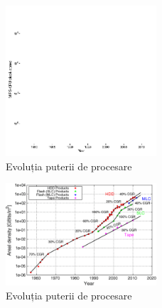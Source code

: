 \begin{figure}
	\centering
	\includegraphics[width=0.5\textwidth]{cpu_and_gpu_trends}
	\caption{Evoluția puterii de procesare\cite{cpu_and_gpu_trends} }
	\label{fig:cpu_and_gpu_trends}
\end{figure}

\begin{figure}
	\centering
	\includegraphics[width=0.5\textwidth]{memory_trends}
	\caption{Evoluția puterii de procesare\cite{memory_trends} }
	\label{fig:memory_trends}
\end{figure}
